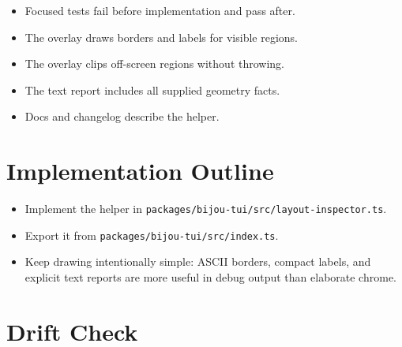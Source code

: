 \begin{itemize}
\tightlist
\item
  Focused tests fail before implementation and pass after.
\item
  The overlay draws borders and labels for visible regions.
\item
  The overlay clips off-screen regions without throwing.
\item
  The text report includes all supplied geometry facts.
\item
  Docs and changelog describe the helper.
\end{itemize}

\section{Implementation Outline}\label{record-122-implementation-outline}

\begin{itemize}
\tightlist
\item
  Implement the helper in \texttt{p\allowbreak{}a\allowbreak{}c\allowbreak{}k\allowbreak{}a\allowbreak{}g\allowbreak{}e\allowbreak{}s\allowbreak{}/\allowbreak{}b\allowbreak{}i\allowbreak{}j\allowbreak{}o\allowbreak{}u\allowbreak{}-\allowbreak{}t\allowbreak{}u\allowbreak{}i\allowbreak{}/\allowbreak{}s\allowbreak{}r\allowbreak{}c\allowbreak{}/\allowbreak{}l\allowbreak{}a\allowbreak{}y\allowbreak{}o\allowbreak{}u\allowbreak{}t\allowbreak{}-\allowbreak{}i\allowbreak{}n\allowbreak{}s\allowbreak{}p\allowbreak{}e\allowbreak{}c\allowbreak{}t\allowbreak{}o\allowbreak{}r\allowbreak{}.\allowbreak{}t\allowbreak{}s}.
\item
  Export it from \texttt{p\allowbreak{}a\allowbreak{}c\allowbreak{}k\allowbreak{}a\allowbreak{}g\allowbreak{}e\allowbreak{}s\allowbreak{}/\allowbreak{}b\allowbreak{}i\allowbreak{}j\allowbreak{}o\allowbreak{}u\allowbreak{}-\allowbreak{}t\allowbreak{}u\allowbreak{}i\allowbreak{}/\allowbreak{}s\allowbreak{}r\allowbreak{}c\allowbreak{}/\allowbreak{}i\allowbreak{}n\allowbreak{}d\allowbreak{}e\allowbreak{}x\allowbreak{}.\allowbreak{}t\allowbreak{}s}.
\item
  Keep drawing intentionally simple: ASCII borders, compact labels, and explicit text reports are more useful in debug output than elaborate chrome.
\end{itemize}

\section{Drift Check}\label{record-122-drift-check}

